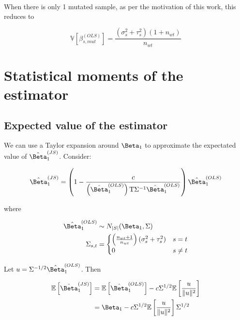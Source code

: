 When there is only 1 mutated sample, as per the motivation of this work, this reduces to

\begin{equation}
  \mathbb{V} \left[\beta_{s, mut}^{(OLS)} \right] = \frac{(\sigma_s^2 + \tau_s^2)(1 + n_{wt})}{n_{wt}}
\end{equation}



\section{Statistical moments of the  estimator}
\label{sec:JS_moments}

\subsection{Expected value of the  estimator}

We can use a Taylor expansion around $\Beta_1$ to approximate the expectated value of $\hat{\Beta}_1^{(JS)}$.
Consider:

\begin{equation*}
  \hat{\Beta}_1^{(JS)} = \left( 1 - \frac{c}{\left( \hat{\Beta}_1^{(OLS)} \right)\tran \Sigma^{-1} \hat{\Beta}_1^{(OLS)}} \right) \hat{\Beta}_1^{(OLS)}
\end{equation*}

where

\begin{align*}
  \hat{\Beta}_1^{(OLS)} & \sim N_{|S|}(\Beta_1, \Sigma) \\
  \Sigma_{s,t}          & = \begin{cases}
    \left( \frac{n_{wt} + 1}{n_{wt}} \right) (\sigma_s^2 + \tau_s^2) & s = t   \\
    0                                                                & s \ne t
  \end{cases}
\end{align*}

Let $u = \Sigma^{-1/2}\hat{\Beta}_1^{(OLS)}$.
Then

\begin{align*}
  \mathbb{E}\left[ \hat{\Beta}_1^{(JS)} \right] & = \mathbb{E} \left[ \hat{\Beta}_1^{(OLS)} \right] - c\Sigma^{1/2}\mathbb{E} \left[ \frac{u}{\Vert u \Vert ^2} \right] \\
                                                & = \Beta_1 - c\Sigma^{1/2}\mathbb{E} \left[ \frac{u}{\Vert u \Vert ^2} \right] \Sigma^{1/2}                            \\
\end{align*}

